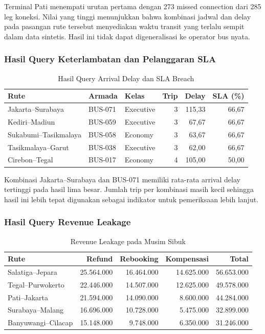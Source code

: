 Terminal Pati menempati urutan pertama dengan 273 missed connection dari 285
leg koneksi. Nilai yang tinggi menunjukkan bahwa kombinasi jadwal dan delay pada
pasangan rute tersebut menyediakan waktu transit yang terlalu sempit dalam data
sintetis. Hasil ini tidak dapat digeneralisasi ke operator bus nyata.

\subsubsection{Hasil Query Keterlambatan dan Pelanggaran SLA}

\begin{table}[htbp]
\centering
\scriptsize
\caption{Hasil Query Arrival Delay dan SLA Breach}
\label{tab:hasil-bq2}
\begin{tabular}{|l|l|l|r|r|r|}
\hline
\textbf{Rute} & \textbf{Armada} & \textbf{Kelas} & \textbf{Trip} &
\textbf{Delay} & \textbf{SLA (\%)} \\
\hline
Jakarta--Surabaya & BUS-071 & Executive & 3 & 115,33 & 66,67 \\
Kediri--Madiun & BUS-059 & Executive & 3 & 67,67 & 66,67 \\
Sukabumi--Tasikmalaya & BUS-058 & Economy & 3 & 63,67 & 66,67 \\
Tasikmalaya--Garut & BUS-038 & Executive & 3 & 62,00 & 66,67 \\
Cirebon--Tegal & BUS-017 & Economy & 4 & 105,00 & 50,00 \\
\hline
\end{tabular}
\end{table}

Kombinasi Jakarta--Surabaya dan BUS-071 memiliki rata-rata arrival delay
tertinggi pada hasil lima besar. Jumlah trip per kombinasi masih kecil sehingga
hasil ini lebih tepat digunakan sebagai indikator untuk pemeriksaan lebih lanjut.

\subsubsection{Hasil Query Revenue Leakage}

\begin{table}[htbp]
\centering
\scriptsize
\caption{Revenue Leakage pada Musim Sibuk}
\label{tab:hasil-bq3}
\begin{tabular}{|l|r|r|r|r|}
\hline
\textbf{Rute} & \textbf{Refund} & \textbf{Rebooking} &
\textbf{Kompensasi} & \textbf{Total} \\
\hline
Salatiga--Jepara & 25.564.000 & 16.464.000 & 14.625.000 & 56.653.000 \\
Tegal--Purwokerto & 22.446.000 & 14.507.000 & 12.625.000 & 49.578.000 \\
Pati--Jakarta & 21.594.000 & 14.090.000 & 8.600.000 & 44.284.000 \\
Surabaya--Malang & 16.696.000 & 10.728.000 & 5.475.000 & 32.899.000 \\
Banyuwangi--Cilacap & 15.148.000 & 9.748.000 & 6.350.000 & 31.246.000 \\
\hline
\end{tabular}
\end{table}

